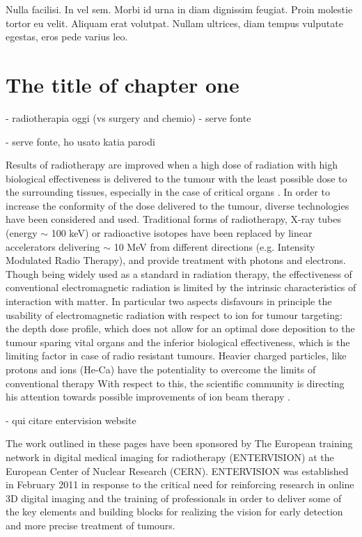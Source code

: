 \begin{savequote}[75mm] 
Nulla facilisi. In vel sem. Morbi id urna in diam dignissim feugiat. Proin molestie tortor eu velit. Aliquam erat volutpat. Nullam ultrices, diam tempus vulputate egestas, eros pede varius leo.
\end{savequote}


\chapter{The title of chapter one}

- radiotherapia oggi (vs surgery and chemio) - serve fonte

- serve fonte, ho usato katia parodi

Results of radiotherapy are improved when a high dose of radiation with high biological effectiveness is delivered to the tumour with the least possible dose to the surrounding tissues, especially in the case of critical organs \cite{Linz2011}.
In order to increase the conformity of the dose delivered to the tumour, diverse technologies have been considered and used.
Traditional forms of radiotherapy, X-ray tubes (energy $\sim$ 100 keV) or radioactive isotopes have been replaced by linear accelerators delivering $\sim$ 10 MeV from different directions (e.g. Intensity Modulated Radio Therapy), and provide treatment with photons and electrons.
Though being widely used as a standard in radiation therapy, the effectiveness of conventional electromagnetic radiation is limited by the intrinsic characteristics of interaction with matter.
In particular two aspects disfavours in principle the usability of electromagnetic radiation with respect to ion for tumour targeting: the depth dose profile, which does not allow for an optimal dose deposition to the tumour sparing vital organs
and the inferior biological effectiveness, which is the limiting factor in case of radio resistant tumours.
Heavier charged particles, like protons and ions (He-Ca) have the potentiality to overcome the limits of conventional therapy With respect to this, the scientific community is directing his attention towards possible improvements of ion beam therapy \cite{Amaldi2011}.

- qui citare entervision website

The work outlined in these pages have been sponsored by  The European training network in digital medical imaging for radiotherapy (ENTERVISION) at the European Center of Nuclear Research (CERN). ENTERVISION was established in February 2011 in response to the critical need for reinforcing research in online 3D digital imaging and the training of professionals in order to deliver some of the key elements and building blocks for realizing the vision for early detection and more precise treatment of tumours.

